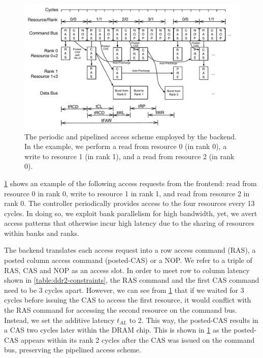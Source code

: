 \begin{figure}
\begin{center}
\includegraphics[width=1.0\linewidth]{figs/backend}
\end{center} 
\caption{The periodic and pipelined access scheme employed by the backend. In the example, we perform a read from resource 0 (in rank 0), a write to resource 1 (in rank 1), and a read from resource 2 (in rank 0).}\label{fig:backend}
\end{figure}

\ref{fig:backend} shows an example of the following access requests from the frontend: read from resource 0 in rank 0, write to resource 1 in rank 1, and read from resource 2 in rank 0. 
The controller periodically provides access to the four resources every 13 cycles. 
In doing so, we exploit bank parallelism for high bandwidth, yet, we avert access patterns that otherwise incur high latency due to the sharing of resources within banks and ranks.


The backend translates each access request into a row access command (RAS), a posted column access command (posted-CAS) or a NOP. 
We refer to a triple of RAS, CAS and NOP as an access slot.
In order to meet row to column latency shown in \ref{table:ddr2-constraints}, the RAS command and the first CAS command need to be 3 cycles apart.
However, we can see from \ref{fig:backend} that if we waited for 3 cycles before issuing the CAS to access the first resource, it would conflict with the RAS command for accessing the second resource on the command bus.
Instead, we set the additive latency $t_{AL}$ to 2.
This way, the posted-CAS results in a CAS two cycles later within the DRAM chip.
This is shown in \ref{fig:backend} as the posted-CAS appears within its rank 2 cycles after the CAS was issued on the command bus, preserving the pipelined access scheme.  

